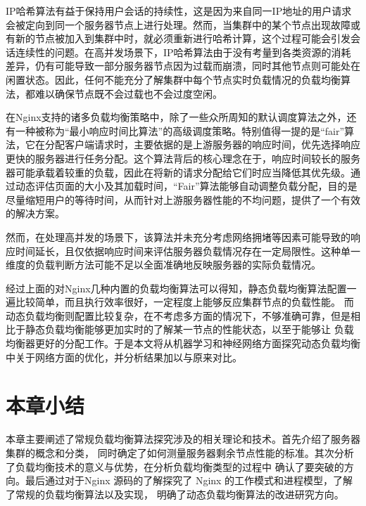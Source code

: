 IP哈希算法有益于保持用户会话的持续性，这是因为来自同一IP地址的用户请求会被定向到同一个服务器节点上进行处理。然而，当集群中的某个节点出现故障或有新的节点被加入到集群中时，就必须重新进行哈希计算，这个过程可能会引发会话连续性的问题。在高并发场景下，IP哈希算法由于没有考量到各类资源的消耗差异，仍有可能导致一部分服务器节点因为过载而崩溃，同时其他节点则可能处在闲置状态。因此，任何不能充分了解集群中每个节点实时负载情况的负载均衡算法，都难以确保节点既不会过载也不会过度空闲。

在Nginx支持的诸多负载均衡策略中，除了一些众所周知的默认调度算法之外，还有一种被称为“最小响应时间比算法”的高级调度策略。特别值得一提的是“fair”算法，它在分配客户端请求时，主要依据的是上游服务器的响应时间，优先选择响应更快的服务器进行任务分配。这个算法背后的核心理念在于，响应时间较长的服务器可能承载着较重的负载，因此在将新的请求分配给它们时应当降低其优先级。通过动态评估页面的大小及其加载时间，“Fair”算法能够自动调整负载分配，目的是尽量缩短用户的等待时间，从而针对上游服务器性能的不均问题，提供了一个有效的解决方案。

然而，在处理高并发的场景下，该算法并未充分考虑网络拥堵等因素可能导致的响应时间延长，且仅依据响应时间来评估服务器负载情况存在一定局限性。这种单一维度的负载判断方法可能不足以全面准确地反映服务器的实际负载情况\cite{张艳肖2023基于Fair函数神经网络的厚度传感器输出特性分析}。

经过上面的对Nginx几种内置的负载均衡算法可以得知，静态负载均衡算法配置一遍比较简单，而且执行效率很好，一定程度上能够反应集群节点的负载性能。
而动态负载均衡则配置比较复杂，在不考虑多方面的情况下，不够准确可靠，但是相比于静态负载均衡能够更加实时的了解某一节点的性能状态，以至于能够让
负载均衡器更好的分配工作。于是本文将从机器学习和神经网络方面探究动态负载均衡中关于网络方面的优化，并分析结果加以与原来对比。

\section{本章小结}

本章主要阐述了常规负载均衡算法探究涉及的相关理论和技术。首先介绍了服务器集群的概念和分类，
同时确定了如何测量服务器剩余节点性能的标准。其次分析了负载均衡技术的意义与优势，在分析负载均衡类型的过程中
确认了要突破的方向。最后通过对于Nginx 源码的了解探究了 Nginx 的工作模式和进程模型，了解了常规的负载均衡算法以及实现，
明确了动态负载均衡算法的改进研究方向。

